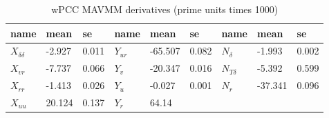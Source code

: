\begin{table}[h]
    \footnotesize
    \centering
    \caption{wPCC MAVMM derivatives (prime units times 1000)}
    \label{\detokenize{06.10_results_wpcc:wpcc-derivatives}}
    \begin{tabular}{|T|T|T|T|T|T|T|T|T|}
\hline


name
&

mean
&

se
&

name
&

mean
&

se
&

name
&

mean
&

se
\\
\hline

\( X_{\delta\delta} \)
&

-2.927
&

0.011
&

\( Y_{ur} \)
&

-65.507
&

0.082
&

\( N_{\delta} \)
&

-1.993
&

0.002
\\
\hline

\( X_{vr} \)
&

-7.737
&

0.066
&

\( Y_{v} \)
&

-20.347
&

0.016
&

\( N_{T\delta} \)
&

-5.392
&

0.599
\\
\hline

\( X_{rr} \)
&

-1.413
&

0.026
&

\( Y_{u} \)
&

-0.027
&

0.001
&

\( N_{r} \)
&

-37.341
&

0.096
\\
\hline

\( X_{uu} \)
&

20.124
&

0.137
&

\( Y_{r} \)
&

64.14
&


\end{tabular}
\end{table}
